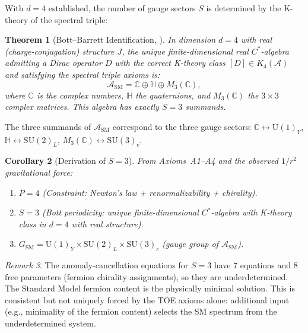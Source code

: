 \documentclass[12pt]{article}
\newtheorem{theorem}{Theorem}[section]
\newtheorem{corollary}[theorem]{Corollary}
\theoremstyle{definition}
\theoremstyle{remark}
\newtheorem{remark}[theorem]{Remark}
\newcommand{\SU}{\mathrm{SU}}
\newcommand{\U}{\mathrm{U}}
\newcommand{\SM}{\mathrm{SM}}
\begin{document}
With $d=4$ established, the number of gauge sectors $S$ is determined by
the K-theory of the spectral triple:

\begin{theorem}[Bott--Barrett Identification, {\cite{Barrett2006,vandenDungen2012}}]
\label{thm:bott}
In dimension $d=4$ with real (charge-conjugation) structure $J$,
the unique finite-dimensional real $C^\ast$-algebra admitting
a Dirac operator $D$ with the correct K-theory class $[D] \in K_4(\mathcal{A})$
and satisfying the spectral triple axioms is:
\begin{equation}\label{eq:A_SM}
\mathcal{A}_\SM = \mathbb{C} \oplus \mathbb{H} \oplus M_3(\mathbb{C}),
\end{equation}
where $\mathbb{C}$ is the complex numbers, $\mathbb{H}$ the quaternions,
and $M_3(\mathbb{C})$ the $3\times 3$ complex matrices.
This algebra has exactly $S = 3$ summands.
\end{theorem}

The three summands of $\mathcal{A}_\SM$ correspond to the three gauge sectors:
$\mathbb{C} \leftrightarrow \U(1)_Y$, $\mathbb{H} \leftrightarrow \SU(2)_L$,
$M_3(\mathbb{C}) \leftrightarrow \SU(3)_c$.

\begin{corollary}[Derivation of $S=3$]
From Axioms~A1--A4 and the observed $1/r^2$ gravitational force:
\begin{enumerate}
\item[\textup{(i)}] $P=4$ (Constraint: Newton's law + renormalizability + chirality).
\item[\textup{(ii)}] $S=3$ (Bott periodicity: unique finite-dimensional $C^\ast$-algebra
  with K-theory class in $d=4$ with real structure).
\item[\textup{(iii)}] $G_\SM = \U(1)_Y \times \SU(2)_L \times \SU(3)_c$
  (gauge group of $\mathcal{A}_\SM$).
\end{enumerate}
\end{corollary}

\begin{remark}
The anomaly-cancellation equations for $S=3$ have $7$ equations and $8$
free parameters (fermion chirality assignments), so they are underdetermined.
The Standard Model fermion content is the physically minimal solution.
This is consistent but not uniquely forced by the TOE axioms alone:
additional input (e.g., minimality of the fermion content) selects
the SM spectrum from the underdetermined system.
\end{remark}
\end{document}
